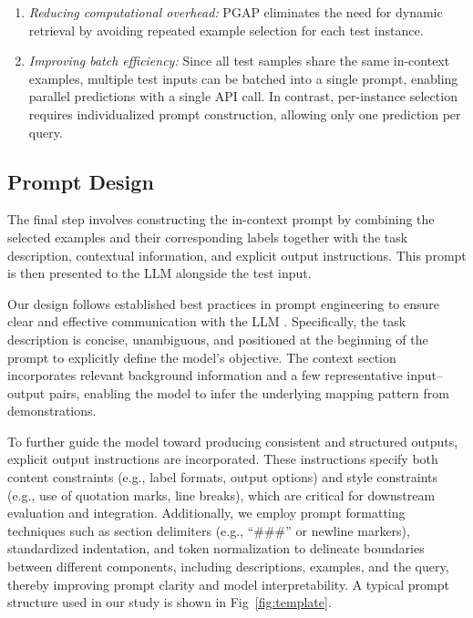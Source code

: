 \documentclass[journal,twocolumn]{IEEEtran}
\begin{document}
\begin{enumerate}
  \item \emph{Reducing computational overhead:} PGAP eliminates the need for dynamic retrieval by avoiding repeated example selection for each test instance.
  \item \emph{Improving batch efficiency:} Since all test samples share the same in-context examples, multiple test inputs can be batched into a single prompt, enabling parallel predictions with a single API call. In contrast, per-instance selection requires individualized prompt construction, allowing only one prediction per query.
\end{enumerate}

\subsection{Prompt Design}

The final step involves constructing the in-context prompt by combining the selected examples and their corresponding labels together with the task description, contextual information, and explicit output instructions. This prompt is then presented to the LLM alongside the test input.

Our design follows established best practices in prompt engineering to ensure clear and effective communication with the LLM \cite{chen2023unleashing}. Specifically, the task description is concise, unambiguous, and positioned at the beginning of the prompt to explicitly define the model's objective. The context section incorporates relevant background information and a few representative input–output pairs, enabling the model to infer the underlying mapping pattern from demonstrations.

To further guide the model toward producing consistent and structured outputs, explicit output instructions are incorporated. These instructions specify both content constraints (e.g., label formats, output options) and style constraints (e.g., use of quotation marks, line breaks), which are critical for downstream evaluation and integration. Additionally, we employ prompt formatting techniques such as section delimiters (e.g., “\#\#\#” or newline markers), standardized indentation, and token normalization to delineate boundaries between different components, including descriptions, examples, and the query, thereby improving prompt clarity and model interpretability. A typical prompt structure used in our study is shown in Fig~\ref{fig:template}.
\end{document}

